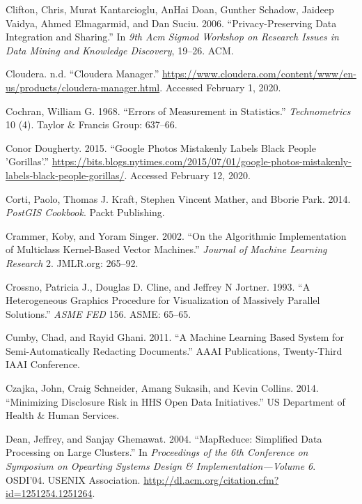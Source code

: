 \documentclass[]{krantz}
\begin{document}
\hypertarget{ref-Clifton06}{}
Clifton, Chris, Murat Kantarcioglu, AnHai Doan, Gunther Schadow, Jaideep
Vaidya, Ahmed Elmagarmid, and Dan Suciu. 2006. ``Privacy-Preserving Data
Integration and Sharing.'' In \emph{9th Acm Sigmod Workshop on Research
Issues in Data Mining and Knowledge Discovery}, 19--26. ACM.

\hypertarget{ref-ClouderaManager}{}
Cloudera. n.d. ``Cloudera Manager.''
\url{https://www.cloudera.com/content/www/en-us/products/cloudera-manager.html}.
Accessed February 1, 2020.

\hypertarget{ref-cochran1968errors}{}
Cochran, William G. 1968. ``Errors of Measurement in Statistics.''
\emph{Technometrics} 10 (4). Taylor \& Francis Group: 637--66.

\hypertarget{ref-dougherty2015}{}
Conor Dougherty. 2015. ``Google Photos Mistakenly Labels Black People
'Gorillas'.''
\url{https://bits.blogs.nytimes.com/2015/07/01/google-photos-mistakenly-labels-black-people-gorillas/}.
Accessed February 12, 2020.

\hypertarget{ref-PostGISCookbook}{}
Corti, Paolo, Thomas J. Kraft, Stephen Vincent Mather, and Bborie Park.
2014. \emph{PostGIS Cookbook}. Packt Publishing.

\hypertarget{ref-crammer2002}{}
Crammer, Koby, and Yoram Singer. 2002. ``On the Algorithmic
Implementation of Multiclass Kernel-Based Vector Machines.''
\emph{Journal of Machine Learning Research} 2. JMLR.org: 265--92.

\hypertarget{ref-crossno1993heterogeneous}{}
Crossno, Patricia J., Douglas D. Cline, and Jeffrey N Jortner. 1993. ``A
Heterogeneous Graphics Procedure for Visualization of Massively Parallel
Solutions.'' \emph{ASME FED} 156. ASME: 65--65.

\hypertarget{ref-Cumby2011}{}
Cumby, Chad, and Rayid Ghani. 2011. ``A Machine Learning Based System
for Semi-Automatically Redacting Documents.'' AAAI Publications,
Twenty-Third IAAI Conference.

\hypertarget{ref-czajka2014minimizing}{}
Czajka, John, Craig Schneider, Amang Sukasih, and Kevin Collins. 2014.
``Minimizing Disclosure Risk in HHS Open Data Initiatives.'' US
Department of Health \& Human Services.

\hypertarget{ref-MapReduce}{}
Dean, Jeffrey, and Sanjay Ghemawat. 2004. ``MapReduce: Simplified Data
Processing on Large Clusters.'' In \emph{Proceedings of the 6th
Conference on Symposium on Opearting Systems Design \&
Implementation---Volume 6}. OSDI'04. USENIX Association.
\url{http://dl.acm.org/citation.cfm?id=1251254.1251264}.
\end{document}

